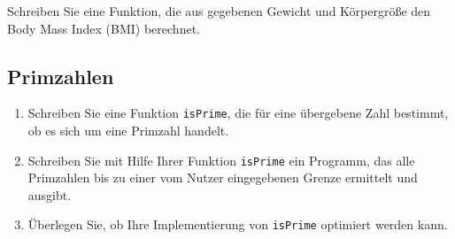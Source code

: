 \documentclass[]{article}
\begin{document}
	Schreiben Sie eine Funktion, die aus gegebenen Gewicht und Körpergröße den Body Mass Index (BMI) berechnet.
	
	\subsection{Primzahlen}
	
	\begin{enumerate}
		\item Schreiben Sie eine Funktion \lstinline|isPrime|, die für eine übergebene Zahl bestimmt, ob es sich um eine Primzahl handelt.
		\item Schreiben Sie mit Hilfe Ihrer Funktion \lstinline|isPrime| ein Programm, das alle Primzahlen bis zu einer vom Nutzer eingegebenen Grenze ermittelt und ausgibt.
		\item Überlegen Sie, ob Ihre Implementierung von \lstinline|isPrime| optimiert werden kann.
	\end{enumerate}
	
\end{document}
